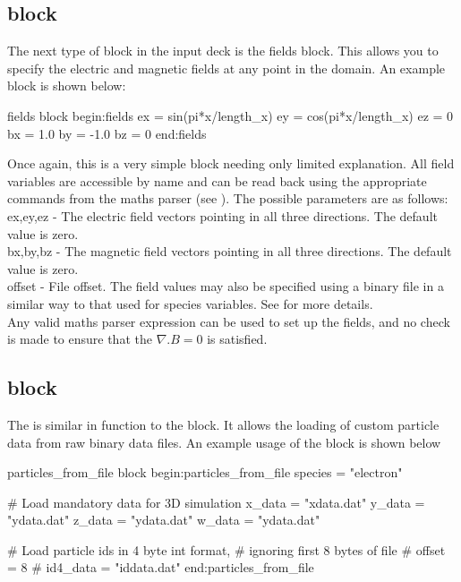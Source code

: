 \subsection{\texorpdfstring
  { block}
  {           {fields} block}}
\label{sec:fields_block}
The next type of block in the {\EPOCH} input deck is the fields block. This
allows you to specify the electric and magnetic fields at any point in the
domain. An example block is shown below:
\begin{lboxverbatim}{fields block}
begin:fields
   ex = sin(pi*x/length_x)
   ey = cos(pi*x/length_x)
   ez = 0
   bx = 1.0
   by = -1.0
   bz = 0
end:fields
\end{lboxverbatim}

Once again, this is a very simple block needing only limited
explanation. All field variables are accessible by name and can be read back
using the appropriate commands from the maths parser (see ).
The possible parameters are as follows:\\

{\emphtext ex,\;ey,\;ez} - The electric field vectors pointing in all three
directions. The default value is zero.\\

{\emphtext bx,\;by,\;bz} - The magnetic field vectors pointing in all three
directions. The default value is zero.\\

{\emphtext offset} - File offset. The field values may also be specified using
a binary file in a similar way to that used for species variables. See
 for more details.\\

Any valid maths parser expression can be used to set up the fields, and no
check is made to ensure that the $\nabla.B = 0$ is satisfied.


\subsection{\texorpdfstring
  { block}
  {           {particles\_from\_file} block}}
\label{sec:particles_from_file}
The  is similar in function to the
 block. It allows the loading of custom particle data from raw
binary data files. An example usage of the block is shown below
\begin{lboxverbatim}{particles\_from\_file block}
begin:particles_from_file
   species = "electron"

   # Load mandatory data for 3D simulation
   x_data = "xdata.dat"
   y_data = "ydata.dat"
   z_data = "ydata.dat"
   w_data = "ydata.dat"

   # Load particle ids in 4 byte int format,
   # ignoring first 8 bytes of file
   # offset = 8
   # id4_data = "iddata.dat"
end:particles_from_file
\end{lboxverbatim}

